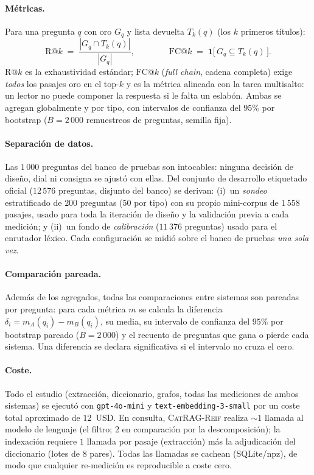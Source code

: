 \documentclass[11pt,a4paper]{article}
\newcommand{\sys}{\textsc{CatRAG-Reif}}          %
\begin{document}
\paragraph{Métricas.}
Para una pregunta $q$ con oro $G_q$ y lista devuelta $T_k(q)$ (los $k$
primeros títulos):
\begin{equation}
\mathrm{R@}k \;=\; \frac{|G_q \cap T_k(q)|}{|G_q|},
\qquad\qquad
\mathrm{FC@}k \;=\; \mathbf{1}\bigl[\,G_q \subseteq T_k(q)\,\bigr].
\label{eq:metricas}
\end{equation}
$\mathrm{R@}k$ es la exhaustividad estándar; $\mathrm{FC@}k$
(\emph{full chain}, cadena completa) exige \emph{todos} los pasajes oro en el
top-$k$ y es la métrica alineada con la tarea multisalto: un lector no puede
componer la respuesta si le falta un eslabón. Ambas se agregan globalmente y
por tipo, con intervalos de confianza del $95\%$ por bootstrap
($B=2\,000$ remuestreos de preguntas, semilla fija).

\paragraph{Separación de datos.}
Las $1\,000$ preguntas del banco de pruebas son intocables: ninguna decisión
de diseño, dial ni consigna se ajustó con ellas. Del conjunto de desarrollo
etiquetado oficial ($12\,576$ preguntas, disjunto del banco) se derivan:
(i)~un \emph{sondeo} estratificado de $200$ preguntas ($50$ por tipo) con su
propio mini-corpus de $1\,558$ pasajes, usado para toda la iteración de
diseño y la validación previa a cada medición; y (ii)~un fondo de
\emph{calibración} ($11\,376$ preguntas) usado para el enrutador léxico.
Cada configuración se midió sobre el banco de pruebas \emph{una sola vez}.

\paragraph{Comparación pareada.}
Además de los agregados, todas las comparaciones entre sistemas son pareadas
por pregunta: para cada métrica $m$ se calcula la diferencia
$\delta_i = m_A(q_i) - m_B(q_i)$, su media, su intervalo de confianza del
$95\%$ por bootstrap pareado ($B=2\,000$) y el recuento de preguntas que
gana o pierde cada sistema. Una diferencia se declara significativa si el
intervalo no cruza el cero.

\paragraph{Coste.}
Todo el estudio (extracción, diccionario, grafos, todas las mediciones de
ambos sistemas) se ejecutó con \texttt{gpt-4o-mini} y
\texttt{text-embedding-3-small} por un coste total aproximado de
$12$~USD. En consulta, \sys{} realiza $\sim\!1$ llamada al modelo de
lenguaje (el filtro; $2$ en comparación por la descomposición); la
indexación requiere $1$ llamada por pasaje (extracción) más la adjudicación
del diccionario (lotes de $8$ pares). Todas las llamadas se cachean
(SQLite/npz), de modo que cualquier re-medición es reproducible a coste
cero.
\end{document}
